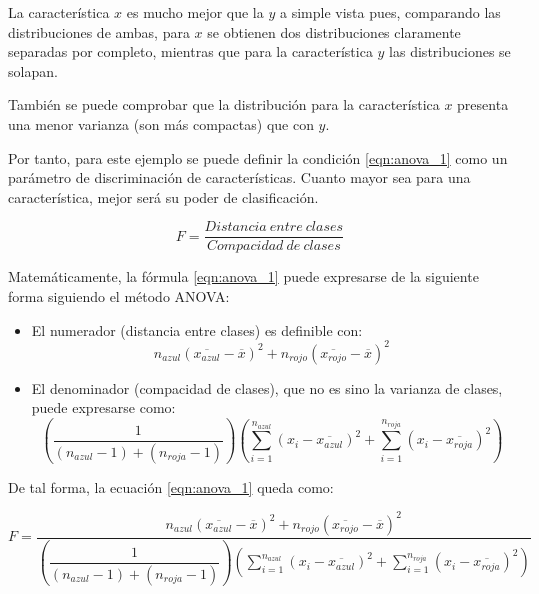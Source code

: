 La característica $x$ es mucho mejor que la $y$ a simple vista pues, comparando las distribuciones de ambas, para $x$ se obtienen dos distribuciones claramente separadas por completo, mientras que para la característica $y$ las distribuciones se solapan.

También se puede comprobar que la distribución para la característica $x$ presenta una menor varianza (son más compactas) que con $y$.

Por tanto, para este ejemplo se puede definir la condición \ref{eqn:anova_1} como un parámetro de discriminación de características. Cuanto mayor sea para una característica, mejor será su poder de clasificación.

\begin{equation}
	F = \dfrac{Distancia\:entre\:clases}{Compacidad\:de\:clases}
	\label{eqn:anova_1}
\end{equation}

Matemáticamente, la fórmula \ref{eqn:anova_1} puede expresarse de la siguiente forma siguiendo el método ANOVA:

\begin{itemize}
	\item El numerador (distancia entre clases) es definible con:
	\begin{equation}
		n_{azul}(\overline{x_{azul}}-\overline{x})^{2} + n_{rojo}(\overline{x_{rojo}}-\overline{x})^{2}
	\end{equation}
	\item El denominador (compacidad de clases), que no es sino la varianza de clases, puede expresarse como:
	\begin{equation}
		\left(\dfrac{1}{(n_{azul}-1)+(n_{roja}-1)}\right)\left(\sum_{i=1}^{n_{azul}}\left(x_{i}-\overline{x_{azul}}\right)^{2}+\sum_{i=1}^{n_{roja}}\left(x_{i}-\overline{x_{roja}}\right)^{2}\right)
	\end{equation}
\end{itemize}

De tal forma, la ecuación \ref{eqn:anova_1} queda como:

\begin{equation}
	F = \dfrac{n_{azul}(\overline{x_{azul}}-\overline{x})^{2} + n_{rojo}(\overline{x_{rojo}}-\overline{x})^{2}}{\left(\dfrac{1}{(n_{azul}-1)+(n_{roja}-1)}\right)\left(\sum_{i=1}^{n_{azul}}\left(x_{i}-\overline{x_{azul}}\right)^{2}+\sum_{i=1}^{n_{roja}}\left(x_{i}-\overline{x_{roja}}\right)^{2}\right)}
	\label{eqn:ANOVA}
\end{equation}

